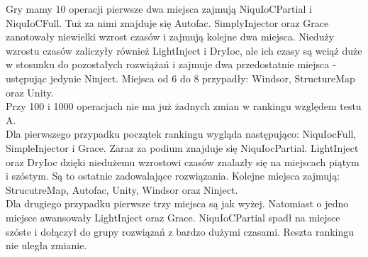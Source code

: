 \documentclass[12pt]{article}
\begin{document}
Gry mamy 10 operacji pierwsze dwa miejsca zajmują NiquIoCPartial i NiquIoCFull. Tuż za nimi znajduje się Autofac. SimplyInjector oraz Grace zanotowały niewielki wzrost czasów i zajmują kolejne dwa miejsca. Nieduży wzrostu czasów zaliczyły również LightInject i DryIoc, ale ich czasy są wciąż duże w stosunku do pozostałych rozwiążań i zajmuje dwa przedostatnie miejsca - ustępując jedynie Ninject. Miejsca od 6 do 8 przypadły: Windsor, StructureMap oraz Unity.\\
Przy 100 i 1000 operacjach nie ma już żadnych zmian w rankingu względem testu A.\\
Dla pierwszego przypadku początek rankingu wygląda następująco: NiquIocFull, SimpleInjector i Grace. Zaraz za podium znajduje się NiquIocPartial. LightInject oraz DryIoc dzięki niedużemu wzrostowi czasów znalazły się na miejscach piątym i szóstym. Są to ostatnie zadowalające rozwiązania. Kolejne miejsca zajmują: StrucutreMap, Autofac, Unity, Windsor oraz Ninject.\\
Dla drugiego przypadku pierwsze trzy miejsca są jak wyżej. Natomiast o jedno miejsce awansowały LightInject oraz Grace. NiquIoCPartial spadł na miejsce szóste i dołączył do grupy rozwiązań z bardzo dużymi czasami. Reszta rankingu nie uległa zmianie.
\end{document}
